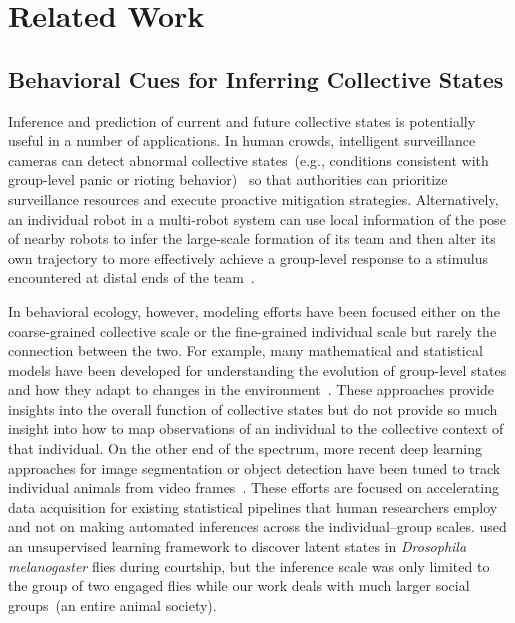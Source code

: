 \documentclass[letterpaper]{article} %
\begin{document}

\section{Related Work}
\label{sec:related_work}

\subsection{Behavioral Cues for Inferring Collective States}
\label{sec:behavioral_cues_to_differentiate_collective_states}

Inference and prediction of current and future collective states is
potentially useful in a number of applications. In human crowds,
intelligent surveillance cameras can detect abnormal collective
states~(e.g., conditions consistent with group-level panic or rioting
behavior)~\citep{MOS09} so that authorities can prioritize surveillance
resources and execute proactive mitigation strategies. Alternatively, an
individual robot in a multi-robot system can use local information of
the pose of nearby robots to infer the large-scale formation of its team
and then alter its own trajectory to more effectively achieve a
group-level response to a stimulus encountered at distal ends of the
team~\citep{CPR17, CKP20}.

In behavioral ecology, however, modeling efforts have been focused
either on the coarse-grained collective scale or the fine-grained
individual scale but rarely the connection between the two. For example,
many mathematical and statistical models have been developed for
understanding the evolution of group-level states and how they adapt to
changes in the environment~\citep{CKJRF02, RLPKCG15, SPSHPL16, PMSF02,
BSCHDMS06}. These approaches provide insights into the overall function
of collective states but do not provide so much insight into how to map
observations of an individual to the collective context of that
individual. On the other end of the spectrum, more recent deep learning
approaches for image segmentation or object detection have been tuned to
track individual animals from video frames~\citep{BHMS18, NMCPBM19}.
These efforts are focused on accelerating data acquisition for existing
statistical pipelines that human researchers employ and not on making
automated inferences across the individual--group scales. 
used an unsupervised learning framework to discover latent states in
\emph{Drosophila melanogaster} flies during courtship, but the inference
scale was only limited to the group of two engaged flies while our work
deals with much larger social groups~(an entire animal society).
\end{document}
